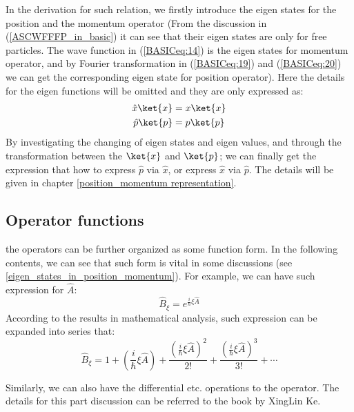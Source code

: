In the derivation for such relation, we firstly introduce the eigen
states for the position and the momentum operator (From the
discussion in (\ref{ASCWFFFP_in_basic}) it can see that their eigen
states are only for free particles. The wave function in
(\ref{BASICeq:14}) is the eigen states for momentum operator, and by
Fourier transformation in (\ref{BASICeq:19}) and (\ref{BASICeq:20})
we can get the corresponding eigen state for position operator).
Here the details for the eigen functions will be omitted and they
are only expressed as:
\begin{align}
\label{PRAMReq:1}
\hat{x}\ket{x} &= x\ket{x} \nonumber \\
\hat{p}\ket{p} &= p\ket{p}
\end{align}
By investigating the changing of eigen states and eigen values, and
through the transformation between the $\ket{x}$ and $\ket{p}$; we
can finally get the expression that how to express $\hat{p}$ via
$\hat{x}$, or express $\hat{x}$ via $\hat{p}$. The details will be
given in chapter \ref{position_momentum representation}.


\subsection{Operator functions}
\label{operator_functions_in_operator}
%
%
%
the operators can be further organized as some function form. In the
following contents, we can see that such form is vital in some
discussions (see \ref{eigen_states_in_position_momentum}). For
example, we can have such expression for $\hat{A}$:
\begin{equation}\label{}
\hat{B}_{\xi} = e^{\frac{i}{\hbar}\xi\hat{A}}
\end{equation}
According to the results in mathematical analysis, such expression
can be expanded into series that:
\begin{equation}
  \hat{B}_{\xi} = 1 + \left(\frac{i}{\hbar}\xi\hat{A}\right) +
 \frac{\left(\frac{i}{\hbar}\xi\hat{A}\right)^{2}}{2!} +
\frac{\left(\frac{i}{\hbar}\xi\hat{A}\right)^{3}}{3!} + \cdots
\end{equation}

Similarly, we can also have the differential etc. operations to the
operator. The details for this part discussion can be referred to
the book by XingLin Ke\cite{XingLinKe}.


